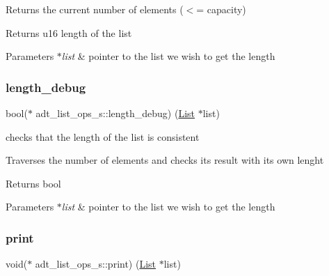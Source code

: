 Returns the current number of elements ($<$= capacity)

\begin{DoxyReturn}{Returns}
u16 length of the list 
\end{DoxyReturn}

\begin{DoxyParams}{Parameters}
{\em $\ast$list} & pointer to the list we wish to get the length \\
\hline
\end{DoxyParams}
\mbox{\label{structadt__list__ops__s_ac4651505fbdf4b8d1db037a3136febe2}} 
\subsubsection{\texorpdfstring{length\+\_\+debug}{length\_debug}}
{\footnotesize\ttfamily bool($\ast$ adt\+\_\+list\+\_\+ops\+\_\+s\+::length\+\_\+debug) (\hyperlink{structadt__list__s}{List} $\ast$list)}



checks that the length of the list is consistent 

Traverses the number of elements and checks its result with its own lenght

\begin{DoxyReturn}{Returns}
bool 
\end{DoxyReturn}

\begin{DoxyParams}{Parameters}
{\em $\ast$list} & pointer to the list we wish to get the length \\
\hline
\end{DoxyParams}
\mbox{\label{structadt__list__ops__s_a8d3f303e41f921e7722b6d43730439d1}} 
\subsubsection{\texorpdfstring{print}{print}}
{\footnotesize\ttfamily void($\ast$ adt\+\_\+list\+\_\+ops\+\_\+s\+::print) (\hyperlink{structadt__list__s}{List} $\ast$list)}



